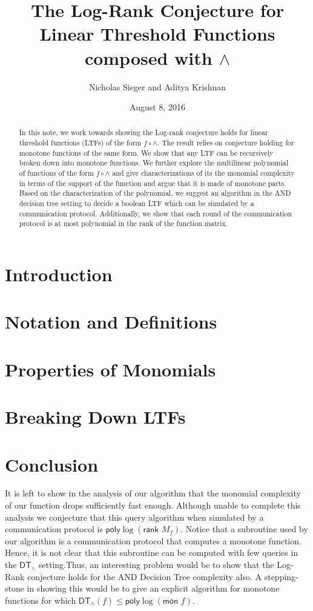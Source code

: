 \documentclass[a4paper]{article}
\title{The Log-Rank Conjecture for Linear Threshold Functions composed with $\wedge$}
\author{Nicholas Sieger and Aditya Krishnan}
\date{August 8, 2016}
\begin{document}
	\maketitle
	\begin{abstract}
		In this note, we work towards showing the Log-rank conjecture holds for linear threshold functions (LTFs) of the form $f \circ \wedge$. The result relies on conjecture holding for monotone functions of the same form. We show that any LTF can be recursively broken down into monotone functions. We further explore the multilinear polynomial of functions of the form $f \circ \wedge$ and give characterizations of its the monomial complexity in terms of the support of the function and argue that it is made of monotone parts. Based on the characterization of the polynomial, we suggest an algorithm in the \textsf{AND} decision tree setting to decide a boolean LTF which can be simulated by a communication protocol. Additionally, we show that each round of the communication protocol is at most polynomial in the rank of the function matrix.  
	\end{abstract}
	\section{Introduction}
	
	\section{Notation and Definitions}
	
	\section{Properties of Monomials}
	
	\section{Breaking Down LTFs}
	
	\section{Conclusion}
	It is left to show in the analysis of our algorithm that the monomial complexity of our function drops sufficiently fast enough. Although unable to complete this analysis we conjecture that this query algorithm when simulated by a communication protocol is $\textsf{poly}\log(\textsf{rank } M_f)$. Notice that a subroutine used by our algorithm is a communication protocol that computes a monotone function. Hence, it is not clear that this subroutine can be computed with few queries in the $\textsf{DT}_\wedge$ setting.Thus, an interesting problem would be to show that the Log-Rank conjecture holds for the AND Decision Tree complexity also. A stepping-stone in showing this would be to give an explicit algorithm for monotone functions for which $\textsf{DT}_\wedge(f) \leq \textsf{poly}\log(\textsf{mon } f)$. 

	\newpage
	
	
	
\end{document}
